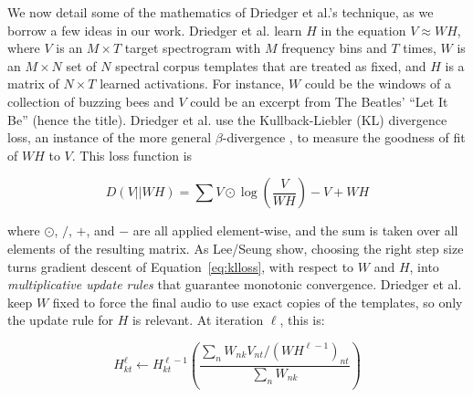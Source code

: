 \documentclass{article}
\begin{document}
We now detail some of the mathematics of Driedger et al.'s technique, as we borrow a few ideas in our work.  Driedger et al. learn $H$ in the equation $V \approx WH$, where $V$ is an $M \times T$ target spectrogram with $M$ frequency bins and $T$ times, $W$ is an $M \times N$ set of $N$ spectral corpus templates that are treated as fixed, and $H$ is a matrix of $N \times T$ learned activations.  For instance, $W$ could be the windows of a collection of buzzing bees and $V$ could be an excerpt from The Beatles' ``Let It Be'' (hence the title).  Driedger et al. use the Kullback-Liebler (KL) divergence loss, an instance of the more general $\beta$-divergence \cite{buch2017nichtnegativematrixfaktorisierungnutzendesklangsynthesensystem}, to measure the goodness of fit of $WH$ to $V$.  This loss function is 

\begin{equation}
\label{eq:klloss}
D(V || WH) = \sum V \odot \log \left( \frac{V}{WH} \right) - V + WH
\end{equation}

where $\odot$, $/$, $+$, and $-$ are all applied element-wise, and the sum is taken over all elements of the resulting matrix.  As Lee/Seung show, choosing the right step size turns gradient descent of Equation~\ref{eq:klloss}, with respect to $W$ and $H$, into {\em multiplicative update rules} that guarantee monotonic convergence.  Driedger et al. keep $W$ fixed to force the final audio to use exact copies of the templates, so only the update rule for $H$ is relevant.  At iteration $\ell$, this is:

\begin{equation}
\label{eq:klhgrad}
H_{kt}^{\ell} \gets H_{kt}^{\ell-1} \left( \frac{ \sum_{n} W_{nk} V_{nt} / (WH^{\ell-1})_{nt} }{ \sum_{n} W_{nk} } \right)
\end{equation}
\end{document}
